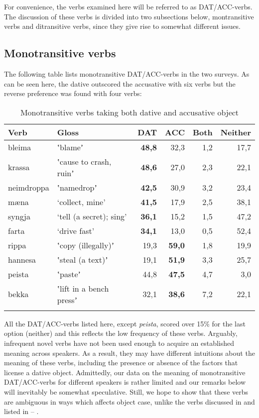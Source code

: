 \documentclass[output=paper,modfonts,nonflat,colorlinks,citecolor=brown]{langsci/langscibook}
\begin{document}
{For convenience, the verbs examined here will be referred to as DAT/ACC-verbs. The discussion of these verbs is divided into two subsections below, montransitive verbs and ditransitive verbs, since they give rise to somewhat different issues.

\subsection{Monotransitive verbs} %

The following table lists monotransitive DAT/ACC-verbs in the two surveys. As can be seen here, the dative outscored the accusative with six verbs but the reverse preference was found with four verbs: 

\begin{table}
{\caption{\label{tab:jonsson:4}Monotransitive verbs taking both dative and accusative object} }
\begin{tabularx}{\textwidth}{XXrrrr}
\lsptoprule
Verb & Gloss & \textbf{DAT} & ACC & Both & Neither\\
\midrule
bleima & ʽblameʼ & \textbf{48,8} & 32,3 & 1,2 & 17,7\\
krassa & ʽcause to crash, ruinʼ & \textbf{48,6} & 27,0 & 2,3 & 22,1\\
neimdroppa & ʽnamedropʼ & \textbf{42,5} & 30,9 & 3,2 & 23,4\\
mæna & ‘collect, mine’ & \textbf{41,5} & 17,9 & 2,5 & 38,1\\
syngja & ‘tell (a secret); sing’ & \textbf{36,1} & 15,2 & 1,5 & 47,2\\
farta & ‘drive fast’ & \textbf{34,1} & 13,0 & 0,5 & 52,4\\
rippa & ʽcopy (illegally)ʼ & 19,3 & \textbf{59,0} & 1,8 & 19,9\\
hannesa & ʽsteal (a text)ʼ & 19,1 & \textbf{51,9} & 3,3 & 25,7\\
peista & ʽpasteʼ & 44,8 & \textbf{47,5} & 4,7 & 3,0\\
bekka & ʽlift in a bench pressʼ & 32,1 & \textbf{38,6} & 7,2 & 22,1\\
\lspbottomrule
\end{tabularx}
\end{table}

All the DAT/ACC-verbs listed here, except \textit{peista}, scored over 15\% for the last option (neither) and this reflects the low frequency of these verbs. Arguably, infrequent novel verbs have not been used enough to acquire an established meaning across speakers. As a result, they may have different intuitions about the meaning of these verbs, including the presence or absence of the factors that license a dative object. Admittedly, our data on the meaning of monotransitive DAT/ACC-verbs for different speakers is rather limited and our remarks below will inevitably be somewhat speculative. Still, we hope to show that these verbs are ambiguous in ways which affects object case, unlike the verbs discussed in  and listed in -- . 

}
\end{document}
